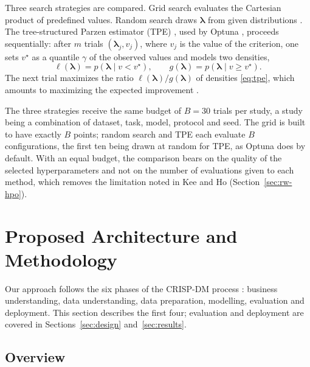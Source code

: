 \documentclass[11pt,a4paper]{article}
\theoremstyle{definition}
\begin{document}
Three search strategies are compared. Grid search evaluates the Cartesian product of predefined values. Random search draws $\boldsymbol\lambda$ from given distributions \cite{bergstra2012random}. The tree-structured Parzen estimator (TPE) \cite{bergstra2011algorithms}, used by Optuna \cite{akiba2019optuna}, proceeds sequentially: after $m$ trials $(\boldsymbol\lambda_j, v_j)$, where $v_j$ is the value of the criterion, one sets $v^\star$ as a quantile $\gamma$ of the observed values and models two densities,
\begin{equation}
  \ell(\boldsymbol\lambda) = p(\boldsymbol\lambda \mid v < v^\star), \qquad g(\boldsymbol\lambda) = p(\boldsymbol\lambda \mid v \ge v^\star).
  \label{eq:tpe}
\end{equation}
The next trial maximizes the ratio $\ell(\boldsymbol\lambda)/g(\boldsymbol\lambda)$ of densities \eqref{eq:tpe}, which amounts to maximizing the expected improvement \cite{bergstra2011algorithms}.

The three strategies receive the same budget of $B = 30$ trials per study, a study being a combination of dataset, task, model, protocol and seed. The grid is built to have exactly $B$ points; random search and TPE each evaluate $B$ configurations, the first ten being drawn at random for TPE, as Optuna does by default. With an equal budget, the comparison bears on the quality of the selected hyperparameters and not on the number of evaluations given to each method, which removes the limitation noted in Kee and Ho (Section~\ref{sec:rw-hpo}).

\section{Proposed Architecture and Methodology}
\label{sec:framework}

Our approach follows the six phases of the CRISP-DM process \cite{wirth2000crisp}: business understanding, data understanding, data preparation, modelling, evaluation and deployment. This section describes the first four; evaluation and deployment are covered in Sections~\ref{sec:design} and~\ref{sec:results}.

\subsection{Overview}
\label{sec:pipeline}
\end{document}

